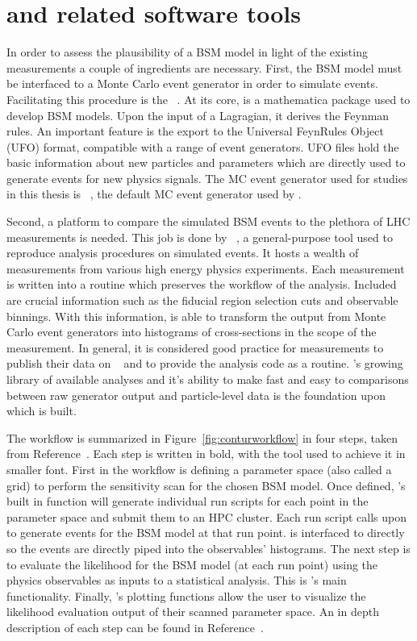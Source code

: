\section{\contur and related software tools}
\label{sec:reinterpretsoftware}In order to assess the plausibility of a BSM model in light of the existing measurements a couple of ingredients are necessary. First, the BSM model must be interfaced to a Monte Carlo event generator in order to simulate events. Facilitating this procedure is the \FeynRules~\cite{}. At its core, \FeynRules is a mathematica package used to develop BSM models. Upon the input of a Lagragian, it derives the Feynman rules. An important feature is the export to the Universal FeynRules Object~\cite{ufo} (UFO) format, compatible with a range of event generators. UFO files hold the basic information about new particles and parameters which are directly used to generate events for new physics signals. The MC event generator used for studies in this thesis is \herwig~\cite{herwig7}, the default MC event generator used by \contur. 

Second, a platform to compare the simulated BSM events to the plethora of LHC measurements is needed. This job is done by \rivet~\cite{rivet}, a general-purpose tool used to reproduce analysis procedures on simulated events. It hosts a wealth of measurements from various high energy physics experiments. Each measurement is written into a \rivet routine which preserves the workflow of the analysis. Included are crucial information such as the fiducial region selection cuts and observable binnings. With this information, \rivet is able to transform the output from Monte Carlo event generators into histograms of cross-sections in the scope of the measurement. In general, it is considered good practice for \LHC measurements to publish their data on \HEPData~\cite{HEPData} and to provide the analysis code as a \rivet routine. \rivet's growing library of available analyses and it's ability to make fast and easy to comparisons between raw generator output and particle-level data is the foundation upon which \contur is built. 

The \contur workflow is summarized in Figure~\ref{fig:conturworkflow} in four steps, taken from Reference~\cite{conturmanual}. Each step is written in bold, with the tool used to achieve it in smaller font. First in the workflow is defining a parameter space (also called a grid) to perform the sensitivity scan for the chosen BSM model. Once defined, \contur's built in function will generate individual run scripts for each point in the parameter space and submit them to an HPC cluster. Each run script calls upon \herwig to generate events for the BSM model at that run point. \herwig is interfaced to \rivet directly so the events are directly piped into the observables' histograms. The next step is to evaluate the likelihood for the BSM model (at each run point) using the physics observables as inputs to a statistical analysis. This is \contur's main functionality. Finally, \contur's plotting functions allow the user to visualize the likelihood evaluation output of their scanned parameter space. An in depth description of each step can be found in Reference~\cite{conturmanual}.